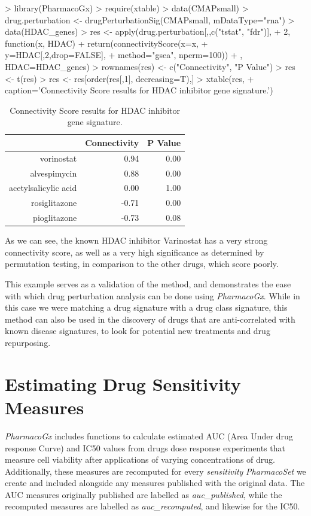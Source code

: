 \documentclass[11pt]{article}
\begin{document}
\begin{Schunk}
\begin{Sinput}
>   library(PharmacoGx)
>   require(xtable)
>   data(CMAPsmall)
>   drug.perturbation <- drugPerturbationSig(CMAPsmall, mDataType="rna")
>   data(HDAC_genes)
>   res <- apply(drug.perturbation[,,c("tstat", "fdr")],
+                2, function(x, HDAC){ 
+ 	    return(connectivityScore(x=x, 
+ 	                             y=HDAC[,2,drop=FALSE], 
+ 	                             method="gsea", nperm=100))
+ 	}, HDAC=HDAC_genes)
>   rownames(res) <- c("Connectivity", "P Value")
>   res <- t(res)
>   res <- res[order(res[,1], decreasing=T),]
>   xtable(res, 
+     caption='Connectivity Score results for HDAC inhibitor gene signature.')
\end{Sinput}
\begin{table}[ht]
\centering
\begin{tabular}{rrr}
  \hline
 & Connectivity & P Value \\ 
  \hline
vorinostat & 0.94 & 0.00 \\ 
  alvespimycin & 0.88 & 0.00 \\ 
  acetylsalicylic acid & 0.00 & 1.00 \\ 
  rosiglitazone & -0.71 & 0.00 \\ 
  pioglitazone & -0.73 & 0.08 \\ 
   \hline
\end{tabular}
\caption{Connectivity Score results for HDAC inhibitor gene signature.} 
\end{table}\end{Schunk}
As we can see, the known HDAC inhibitor Varinostat has a very strong connectivity score, as well as a very high significance as determined by permutation testing, in comparison to the other drugs, which score poorly. 

This example serves as a validation of the method, and demonstrates the ease with which drug perturbation analysis can be done using \textit{PharmacoGx}. While in this case we were matching a drug signature with a drug class signature, this method can also be used in the discovery of drugs that are anti-correlated with known disease signatures, to look for potential new treatments and drug repurposing.


\section{Estimating Drug Sensitivity Measures}
\textit{PharmacoGx} includes functions to calculate estimated AUC (Area Under
drug response Curve) and IC50 values from drugs dose response experiments that
measure cell viability after applications of varying concentrations of drug.
Additionally, these measures are recomputed for every \textit{sensitivity}
\textit{PharmacoSet} we create and included alongside any measures published
with the original data. The AUC measures originally published are labelled as \textit{auc\_published}, while the recomputed measures are labelled as \textit{auc\_recomputed}, and likewise for the IC50.
\end{document}
